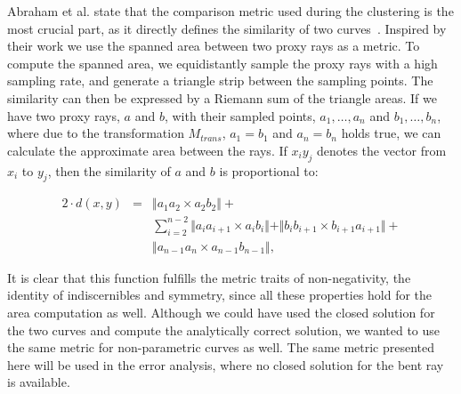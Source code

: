 \documentclass[journal]{vgtc}                %
\begin{document}
Abraham et al. state that the comparison metric used during the clustering is the most crucial part, as it directly defines the similarity of two curves~\cite{abraham03clustering}. Inspired by their work we use the spanned area between two proxy rays as a metric. To compute the spanned area, we equidistantly sample the proxy rays with a high sampling rate, and generate a triangle strip between the sampling points. The similarity can then be expressed by a Riemann sum of the triangle areas. If we have two proxy rays, $a$ and $b$, with their sampled points, $a_1,\dots,a_n$ and $b_1,\dots,b_n$, where due to the transformation $M_{trans}$, $a_1=b_1$ and $a_n=b_n$ holds true, we can calculate the approximate area between the rays. If $x_iy_j$ denotes the vector from $x_i$ to $y_j$, then the similarity of $a$ and $b$ is proportional to:

\begin{eqnarray*}
2\cdot d(x,y) &=& \Vert a_1a_2 \times a_2b_2\Vert + \\
&& \sum_{i=2}^{n-2}\Vert a_ia_{i+1} \times a_ib_i \Vert + \Vert b_ib_{i+1} \times b_{i+1}a_{i+1}\Vert + \\
&& \Vert a_{n-1}a_n \times a_{n-1}b_{n-1}\Vert,
\end{eqnarray*}

It is clear that this function fulfills the metric traits of non-negativity, the identity of indiscernibles and symmetry, since all these properties hold for the area computation as well. Although we could have used the closed solution for the two curves and compute the analytically correct solution, we wanted to use the same metric for non-parametric curves as well. The same metric presented here will be used in the error analysis, where no closed solution for the bent ray is available.
\end{document}
